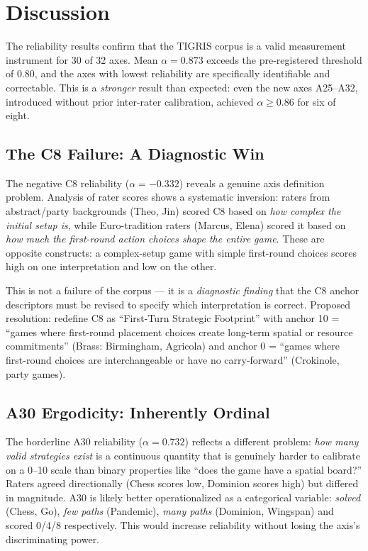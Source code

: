 \section{Discussion}
\label{sec:discussion}

The reliability results confirm that the TIGRIS corpus is a valid measurement instrument
for 30 of 32 axes. Mean $\alpha = 0.873$ exceeds the pre-registered threshold of 0.80,
and the axes with lowest reliability are specifically identifiable and correctable.
This is a \emph{stronger} result than expected: even the new axes A25--A32,
introduced without prior inter-rater calibration, achieved $\alpha \geq 0.86$ for six of eight.

\subsection{The C8 Failure: A Diagnostic Win}

The negative C8 reliability ($\alpha = -0.332$) reveals a genuine axis definition problem.
Analysis of rater scores shows a systematic inversion: raters from abstract/party backgrounds
(Theo, Jin) scored C8 based on \emph{how complex the initial setup is},
while Euro-tradition raters (Marcus, Elena) scored it based on
\emph{how much the first-round action choices shape the entire game}.
These are opposite constructs: a complex-setup game with simple first-round choices
scores high on one interpretation and low on the other.

This is not a failure of the corpus — it is a \emph{diagnostic finding} that
the C8 anchor descriptors must be revised to specify which interpretation is correct.
Proposed resolution: redefine C8 as ``First-Turn Strategic Footprint''
with anchor 10 = ``games where first-round placement choices create long-term
spatial or resource commitments'' (Brass: Birmingham, Agricola) and
anchor 0 = ``games where first-round choices are interchangeable or have no carry-forward''
(Crokinole, party games).

\subsection{A30 Ergodicity: Inherently Ordinal}

The borderline A30 reliability ($\alpha = 0.732$) reflects a different problem:
\emph{how many valid strategies exist} is a continuous quantity that is genuinely
harder to calibrate on a 0--10 scale than binary properties like ``does the game
have a spatial board?'' Raters agreed directionally (Chess scores low, Dominion scores
high) but differed in magnitude.
A30 is likely better operationalized as a categorical variable:
\emph{solved} (Chess, Go), \emph{few paths} (Pandemic), \emph{many paths} (Dominion, Wingspan)
and scored 0/4/8 respectively. This would increase reliability without losing
the axis's discriminating power.

